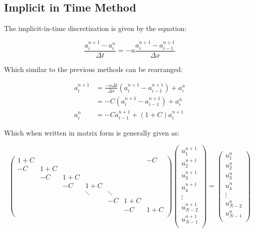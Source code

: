\subsection*{Implicit in Time Method}
\label{sec:Q5c}

The implicit-in-time discretization is given by the equation:

\begin{equation}
    \frac{a_i^{n+1}-a_i^n}{\Delta t} = -u\frac{a_i^{n+1}-a_{i-1}^{n+1}}{\Delta x}
\label{eq:IIT}
\end{equation}

Which similar to the previous methods can be rearranged:

\begin{equation}
\begin{split}
    a_i^{n+1} & = \frac{-u \Delta t}{\Delta x} (a_{i}^{n+1} - a_{i-1}^{n+1}) + a_i^n \\
              & = - C (a_{i}^{n+1} - a_{i-1}^{n+1}) + a_i^n \\
    a_i^n &= -C a_{i-1}^{n+1} + (1+C) a_{i}^{n+1}
\end{split}
\label{eq:IIT_a}
\end{equation}

Which when written in matrix form is generally given as:

\begin{equation}
\begin{pmatrix}
1+C &     &     &        &        &     & -C  \\
-C  & 1+C &     &        &        &     &     \\
    & -C  & 1+C &        &        &     &     \\
    &     & -C  & 1+C    &        &     &     \\
    &     &     & \ddots & \ddots &     &     \\
    &     &     &        & -C     & 1+C &     \\
    &     &     &        &        & -C  & 1+C \\
\end{pmatrix}
\begin{pmatrix}
u_1^{n+1}     \\
u_2^{n+1}     \\
u_3^{n+1}     \\
u_4^{n+1}     \\
\vdots        \\
u_{N-2}^{n+1} \\
u_{N-1}^{n+1} \\
\end{pmatrix}
=
\begin{pmatrix}
u_1^{n}     \\
u_2^{n}     \\
u_3^{n}     \\
u_4^{n}     \\
\vdots      \\
u_{N-2}^{n} \\
u_{N-1}^{n} \\
\end{pmatrix}
\end{equation}

